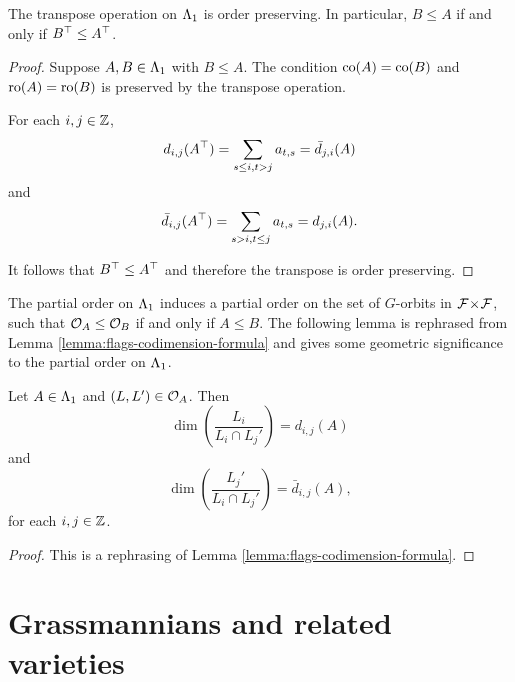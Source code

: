 \documentclass[a4paper, 11pt]{report}
\begin{document}
\begin{lemma}\label{lemma:transpose-preserves-order}
The transpose operation on $\Lambda_1{}$ is order preserving. In particular, $B\le A$ if and only if $B^\top\le A^\top$.
\end{lemma}

\begin{proof}
Suppose $A,B\in\Lambda_1{}$ with $B\le A$. The condition $\operatorname{co}(A)=\operatorname{co}(B)$ and $\operatorname{ro}(A)=\operatorname{ro}(B)$ is preserved by the transpose operation.

For each $i,j\in\mathbb{Z}$,
\begin{equation*}
d_{i,j}{(A^\top)} = \sum_{s\le i,t>j} a_{t,s} = \bar{d}_{j,i}{(A)}
\end{equation*}
and
\begin{equation*}
\bar{d}_{i,j}{(A^\top)} = \sum_{s>i,t\le j} a_{t,s} = d_{j,i}{(A)}.
\end{equation*}

It follows that $B^\top\le A^\top$ and therefore the transpose is order preserving.
\end{proof}

The partial order on $\Lambda_1{}$ induces a partial order on the set of $G$-orbits in ${\mathcal{F}\!\times\!\mathcal{F}}$, such that $\mathcal{O}_{A}\le \mathcal{O}_{B}$ if and only if $A\le B$. The following lemma is rephrased from Lemma \ref{lemma:flags-codimension-formula} and gives some geometric significance to the partial order on $\Lambda_1{}$.

\begin{lemma}\label{lemma:codimension-formula-corner-sums}
Let $A\in\Lambda_1{}$ and $(L,L')\in\mathcal{O}_{A}$. Then
\begin{equation*}
\dim\left(\frac{L_i}{L_i\cap L_j'}\right) = d_{i,j}{(A)}
\end{equation*}
and
\begin{equation*}
\dim\left(\frac{L_j'}{L_i\cap L_j'}\right) = \bar{d}_{i,j}{(A)},
\end{equation*}
for each $i,j\in\mathbb{Z}$.
\end{lemma}
\begin{proof}
This is a rephrasing of Lemma \ref{lemma:flags-codimension-formula}.
\end{proof}


\section{Grassmannians and related varieties}
\end{document}
